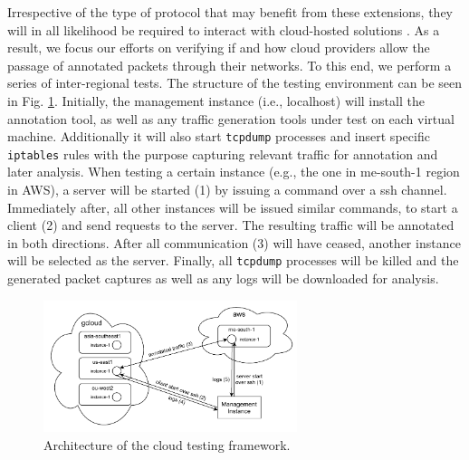 Irrespective of the type of protocol that may benefit from these extensions, they will in all likelihood be required to interact with cloud-hosted solutions \cite{daielephant}. As a result, we focus our efforts on verifying if and how cloud providers allow the passage of annotated packets through their networks. To this end, we perform a series of inter-regional tests. The structure of the testing environment can be seen in Fig. \ref{extend:ops:fig:architecture}. Initially, the management instance (i.e., localhost) will install the annotation tool, as well as any traffic generation tools under test on each virtual machine. Additionally it will also start \texttt{tcpdump} processes and insert specific \texttt{iptables} rules with the purpose capturing relevant traffic for annotation and later analysis. When testing a certain instance (e.g., the one in me-south-1 region in AWS), a server will be started (1) by issuing a command over a ssh channel. Immediately after, all other instances will be issued similar commands, to start a client (2) and send requests to the server. The resulting traffic will be annotated in both directions. After all communication (3) will have ceased, another instance will be selected as the server. Finally, all \texttt{tcpdump} processes will be killed and the generated packet captures as well as any logs will be downloaded for analysis.

\begin{figure}[htb]
    \begin{center}
        \includegraphics[width=0.66\textwidth,keepaspectratio]{figures/architecture.pdf}
    \end{center}
    \caption{Architecture of the cloud testing framework.}
    \label{extend:ops:fig:architecture}
\end{figure}

